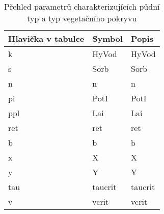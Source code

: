 \begin{table}%
  \centering
  \caption{Přehled parametrů charakterizujících půdní typ a typ vegetačního pokryvu}
  {\small
    \begin{tabular}{p{1.5cm}ll}
    \hline
    Hlavička v tabulce & Symbol & Popis \\
    \hline \hline
    k&\acs{HyVod}  & \acl{HyVod} \\
    s&\acs{Sorb}   & \acl{Sorb} \\
    n&\acs{n}      & \acl{n}\\
    pi&\acs{PotI}   & \acl{PotI}\\
    ppl&\acs{Lai}    & \acl{Lai} \\
    ret&\acs{ret}    & \acl{ret} \\
    b&\acs{b}      & \acl{b} \\
    x&\acs{X}      & \acl{X} \\
    y&\acs{Y}      & \acl{Y} \\
    tau&\acs{taucrit}& \acl{taucrit} \\
    v&\acs{vcrit}  & \acl{vcrit} \\
    \hline
    \end{tabular}%
  }
  \label{tab:soilveg}%
\end{table}%